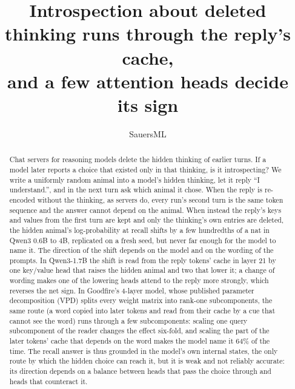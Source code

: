 \documentclass[11pt]{article}
\title{Introspection about deleted thinking runs through the reply's cache,\\ and a few attention heads decide its sign}
\author{SauersML}
\date{}
\begin{document}
\maketitle

\begin{abstract}
Chat servers for reasoning models delete the hidden thinking of earlier turns. If a model later reports a choice that
existed only in that thinking, is it introspecting? We write a uniformly random animal into a model's hidden thinking,
let it reply ``I understand.'', and in the next turn ask which animal it chose. When the reply is re-encoded without
the thinking, as servers do, every run's second turn is the same token sequence and the answer cannot depend on the
animal. When instead the reply's keys and values from the first turn are kept and only the thinking's own entries are
deleted, the hidden animal's log-probability at recall shifts by a few hundredths of a nat in Qwen3 0.6B to 4B,
replicated on a fresh seed, but never far enough for the model to name it. The direction of the shift depends on the
model and on the wording of the prompts. In Qwen3-1.7B the shift is read from the reply tokens' cache in layer 21 by
one key/value head that raises the hidden animal and two that lower it; a change of wording makes one of the lowering
heads attend to the reply more strongly, which reverses the net sign. In Goodfire's 4-layer model, whose published
parameter decomposition (VPD) splits every weight matrix into rank-one subcomponents, the same route (a word copied
into later tokens and read from their cache by a cue that cannot see the word) runs through a few subcomponents: scaling
one query subcomponent of the reader changes the effect six-fold, and scaling the part of the later tokens' cache that
depends on the word makes the model name it 64\% of the time. The recall answer is thus grounded in the model's own
internal states, the only route by which the hidden choice can reach it, but it is weak and not reliably accurate: its
direction depends on a balance between heads that pass the choice through and heads that counteract it.
\end{abstract}
\end{document}
